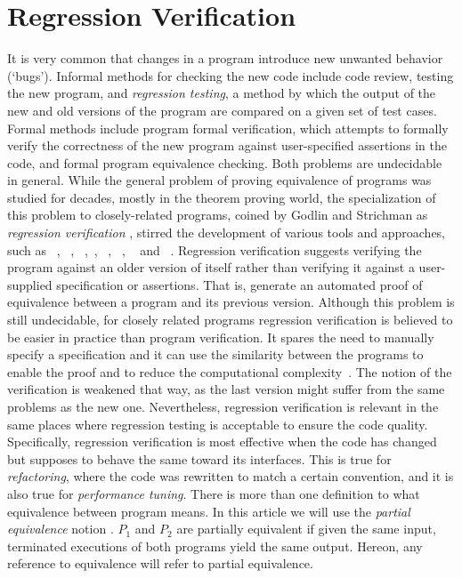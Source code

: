 
\section{Regression Verification}
It is very common that changes in a program introduce new unwanted behavior (`bugs'). Informal methods for checking the new code include code review, testing the new program, and \emph{regression testing}, a method by which the output of the new and old versions of the program are compared on a given set of test cases. Formal methods include program formal verification, which attempts to formally verify the correctness of the new program against user-specified assertions in the code, and formal program equivalence checking. Both problems are undecidable in general. While the general problem of proving equivalence of programs was studied for decades, mostly in the theorem proving world, the specialization of this problem to closely-related programs, coined by  
Godlin and Strichman as \emph{regression verification} \cite{DBLP:conf/dac/GodlinS09}, stirred the development of various tools and approaches, such as ~\cite{DBLP:conf/dac/GodlinS09}, ~\cite{DBLP:conf/kbse/FelsingGKRU14}, ~\cite{DBLP:conf/cav/LahiriHKR12},~\cite{10.1145/3368089.3409757}, ~\cite{9285657}, ~\cite{10.1007/978-3-319-66706-5_20}, ~\cite{inproceedings} and ~\cite{10.1145/1453101.1453131}. Regression verification suggests verifying the program against an older version of itself rather than verifying it against a user-supplied specification or assertions. That is, generate an automated proof of equivalence between a program and its previous version. Although this problem is still undecidable, for closely related programs regression verification is believed to be easier in practice than program verification. It spares the need to manually specify a specification and it can use the similarity between the programs to enable the proof  and to reduce the computational complexity~\cite{DBLP:conf/dac/GodlinS09}. The notion of the verification is weakened that way, as the last version might suffer from the same problems as the new one. Nevertheless, regression verification is relevant in the same places where regression testing is acceptable to ensure the code quality. Specifically, regression verification is most effective when the code has changed but supposes to behave the same toward its interfaces. This is true for \emph{refactoring}, where the code was rewritten to match a certain convention, and it is also true for \emph{performance tuning}. There is more than one definition to what equivalence between program means. In this article we will use the \emph{partial equivalence} notion \cite{DBLP:conf/dac/GodlinS09}. $P_1$ and $P_2$ are partially equivalent if given the same input, terminated executions of both programs yield the same output. Hereon, any reference to equivalence will refer to partial equivalence.

